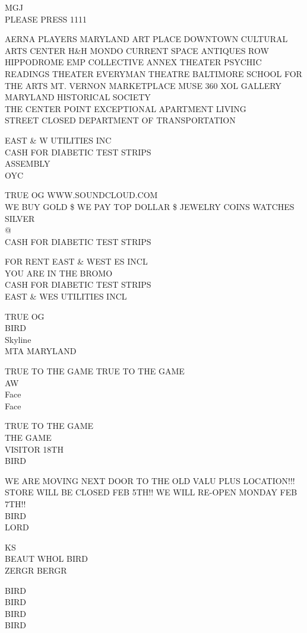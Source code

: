 \documentclass[10pt,letterpaper]{article}
\begin{document}
MGJ\\
PLEASE PRESS 1111

AERNA PLAYERS MARYLAND ART PLACE DOWNTOWN CULTURAL ARTS CENTER H\&H MONDO CURRENT SPACE ANTIQUES ROW\\
HIPPODROME EMP COLLECTIVE ANNEX THEATER PSYCHIC READINGS THEATER EVERYMAN THEATRE BALTIMORE SCHOOL FOR THE ARTS MT. VERNON MARKETPLACE MUSE 360 XOL GALLERY MARYLAND HISTORICAL SOCIETY\\
THE CENTER POINT EXCEPTIONAL APARTMENT LIVING\\
STREET CLOSED DEPARTMENT OF TRANSPORTATION

EAST  \& W UTILITIES INC\\
CASH FOR DIABETIC TEST STRIPS\\
ASSEMBLY\\
OYC

TRUE OG WWW.SOUNDCLOUD.COM\\
WE BUY GOLD \$ WE PAY TOP DOLLAR \$ JEWELRY COINS WATCHES SILVER\\
@\\
CASH FOR DIABETIC TEST STRIPS

FOR RENT EAST \& WEST ES INCL\\
YOU ARE IN THE BROMO\\
CASH FOR DIABETIC TEST STRIPS\\
EAST \& WES UTILITIES INCL

TRUE OG\\
BIRD\\
Skyline\\
MTA MARYLAND

TRUE TO THE GAME TRUE TO THE GAME\\
AW\\
Face\\
Face

TRUE TO THE GAME\\
THE GAME\\
VISITOR 18TH\\
BIRD

WE ARE MOVING NEXT DOOR TO THE OLD VALU PLUS LOCATION!!! STORE WILL BE CLOSED FEB 5TH!! WE WILL RE{-}OPEN MONDAY FEB 7TH!!\\
BIRD\\
LORD

KS\\
BEAUT WHOL BIRD\\
ZERGR BERGR

BIRD\\
BIRD\\
BIRD\\
BIRD
\end{document}
